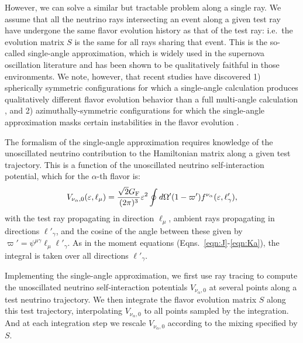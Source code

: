 \documentclass[aps,floatfix,prd,superscriptaddress,twocolumn]{revtex4-1}
\begin{document}
However, we can solve a similar but tractable problem along a single ray.
We assume that all the neutrino rays intersecting an event along a given test ray
have undergone the same flavor evolution history as that of the test ray:
i.e.\ the evolution matrix $S$ is the same for all rays sharing that event.
This is the so-called single-angle approximation,
which is widely used in the supernova oscillation literature
and has been shown to be qualitatively faithful in those environments.
We note, however, that recent studies have discovered 1) spherically symmetric
configurations for which a single-angle calculation produces qualitatively
different flavor evolution behavior than a full multi-angle calculation
\cite{vlas2018-multiangle},
and 2) azimuthally-symmetric configurations for which the single-angle
approximation masks certain instabilities
in the flavor evolution \cite{wu2017-fast_neutrino_conversions}.

The formalism of the single-angle approximation requires knowledge of
the unoscillated neutrino contribution to the Hamiltonian matrix
along a given test trajectory.
This is a function of the unoscillated neutrino self-interaction potential,
which for the $\alpha$-th flavor is:
\begin{equation}
  \label{eqn:V_nu_alpha}
  V_{\nu_\alpha,0}(\varepsilon,\ell_\mu) =
  \frac{\sqrt{2}G_{\rm F}}{(2\pi)^3} \varepsilon^2
  \oint d\Omega'(1-\varpi')f^{\nu_\alpha}(\varepsilon,\ell'_\gamma),
\end{equation}
with the test ray propagating in direction $\ell_\mu$,
ambient rays propagating in directions $\ell'_\gamma$,
and the cosine of the angle between these given by
$\varpi'=\psi^{\mu\gamma} \ell_\mu \ell'_\gamma$.
As in the moment equations (Eqns.~\ref{eqn:J}-\ref{eqn:Ka}),
the integral is taken over all directions $\ell'_\gamma$.

Implementing the single-angle approximation, we first use ray tracing to compute
the unoscillated neutrino self-interaction potentials $V_{\nu_\alpha,0}$
at several points along a test neutrino trajectory.
We then integrate the flavor evolution matrix $S$ along this test trajectory,
interpolating $V_{\nu_\alpha,0}$ to all points sampled by the integration.
And at each integration step we rescale $V_{\nu_\alpha,0}$ according to the
mixing specified by $S$.
\end{document}
